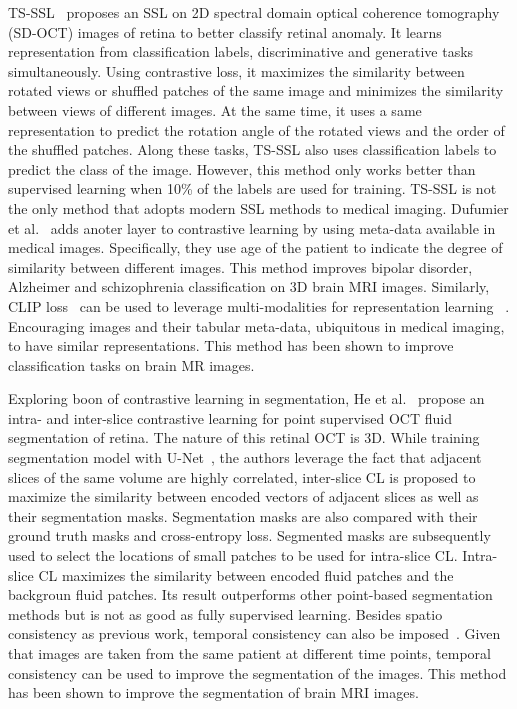 \documentclass[a4paper,11pt,oneside]{report}
\begin{document}
TS-SSL~\cite{Zhang2021} proposes an SSL on 2D spectral domain optical coherence tomography (SD-OCT) images of retina to better classify retinal anomaly. It learns representation from classification labels, discriminative and generative tasks simultaneously. Using contrastive loss, it maximizes the similarity between rotated views or shuffled patches of the same image and minimizes the similarity between views of different images. At the same time, it uses a same representation to predict the rotation angle of the rotated views and the order of the shuffled patches. Along these tasks, TS-SSL also uses classification labels to predict the class of the image. However, this method only works better than supervised learning when 10\% of the labels are used for training. TS-SSL is not the only method that adopts modern SSL methods to medical imaging. Dufumier et al.~\cite{Dufumier2021} adds anoter layer to contrastive learning by using meta-data available in medical images. Specifically, they use age of the patient to indicate the degree of similarity between different images. This method improves bipolar disorder, Alzheimer and schizophrenia classification on 3D brain MRI images. Similarly, CLIP loss~\cite{Radford2021CLIP} can be used to leverage multi-modalities for representation learning ~\cite{Hager2023}. Encouraging images and their tabular meta-data, ubiquitous in medical imaging, to have similar representations. This method has been shown to improve classification tasks on brain MR images. 

Exploring boon of contrastive learning in segmentation, He et al.~\cite{He2022Intra} propose an intra- and inter-slice contrastive learning for point supervised OCT fluid segmentation of retina. The nature of this retinal OCT is 3D. While training segmentation model with U-Net~\cite{Ronneberger2015}, the authors leverage the fact that adjacent slices of the same volume are highly correlated, inter-slice CL is proposed to maximize the similarity between encoded vectors of adjacent slices as well as their segmentation masks. Segmentation masks are also compared with their ground truth masks and cross-entropy loss. Segmented masks are subsequently used to select the locations of small patches to be used for intra-slice CL. Intra-slice CL maximizes the similarity between encoded fluid patches and the backgroun fluid patches. Its result outperforms other point-based segmentation methods but is not as good as fully supervised learning. Besides spatio consistency as previous work, temporal consistency can also be imposed~\cite{Ren2022}. Given that images are taken from the same patient at different time points, temporal consistency can be used to improve the segmentation of the images. This method has been shown to improve the segmentation of brain MRI images.
\end{document}
